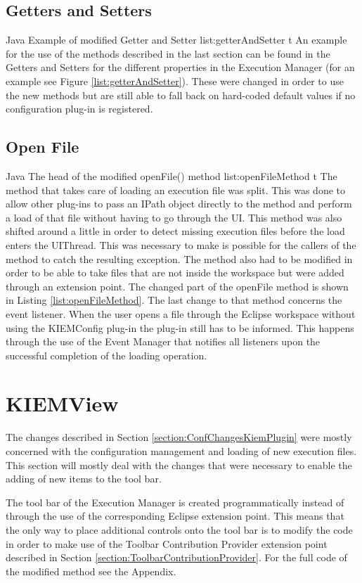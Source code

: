 \subsection{Getters and Setters}
\listingjava
{}
{Java}
{Example of modified Getter and Setter}
{list:getterAndSetter}
{t}
An example for the use of the methods described in the last section can be found in the Getters and Setters for
the different properties in the Execution Manager (for an example see Figure \ref{list:getterAndSetter}). 
These were changed in order to use the new methods but are
still able to fall back on hard-coded default values if no configuration plug-in is registered.


\subsection{Open File}
\label{section:ConfKiemOpenFile}
\listingjava
{}
{Java}
{The head of the modified openFile() method}
{list:openFileMethod}
{t}
The method that takes care of loading an execution file was split. This was done to allow
other plug-ins to pass an IPath object directly to the method and perform a load of that file without
having to go through the \ac{UI}. This method was also shifted around a little in order to detect
missing execution files before the load enters the \ac{UI}Thread. This was necessary to make is possible for
the callers of the method to catch the resulting exception.
The method also had to be modified in order to be able to take files that are not inside the workspace
but were added through an extension point. The changed part of the openFile method is shown in 
Listing \ref{list:openFileMethod}.
The last change to that method concerns the event listener. When the user opens a file through the
Eclipse workspace without using the \ac{KIEMConfig} plug-in the plug-in still has to be informed.
This happens through the use of the Event Manager that notifies all listeners upon the successful
completion of the loading operation.


\section{KIEMView}
\label{section:ConfChangesKiemView}
The changes described in Section \ref{section:ConfChangesKiemPlugin} were mostly concerned with the
configuration management and loading of new execution files. This section will mostly deal with the changes
that were necessary to enable the adding of new items to the tool bar.

The tool bar of the Execution Manager is created programmatically instead of through the use of the
corresponding Eclipse extension point. This means that the only way to place additional controls onto the tool bar
is to modify the code in order to make use of the Toolbar Contribution Provider extension point described
in Section \ref{section:ToolbarContributionProvider}. For the full code of the modified method see the
Appendix.
